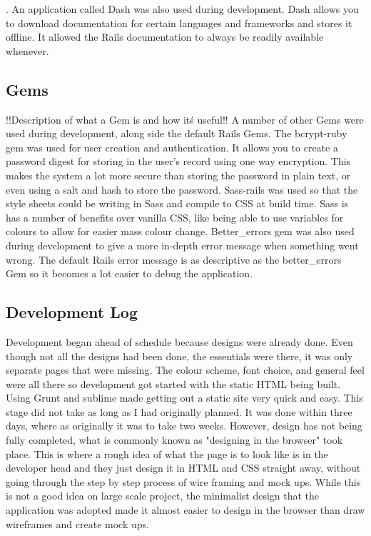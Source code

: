 \pageref{sec:deployment}. An application called Dash \citep{dash:2014} was also used during development. Dash allows you to download documentation for certain languages and frameworks and stores it offline. It allowed the Rails documentation to always be readily available whenever.

\subsection{Gems}
!!Description of what a Gem is and how it\'s useful!! A number of other Gems were used during development, along side the default Rails Gems. The bcrypt-ruby gem was used for user creation and authentication. It allows you to create a password digest for storing in the user's record using one way encryption. This makes the system a lot more secure than storing the password in plain text, or even using a salt and hash to store the password. Sass-rails was used so that the style sheets could be writing in Sass and compile to CSS at build time. Sass is has a number of benefits over vanilla CSS, like being able to use variables for colours to allow for easier mass colour change. Better_errors gem was also used during development to give a more in-depth error message when something went wrong. The default Rails error message is as descriptive as the better_errors Gem so it becomes a lot easier to debug the application.

\subsection{Development Log}
Development began ahead of schedule because designs were already done. Even though not all the designs had been done, the essentials were there, it was only separate pages that were missing. The colour scheme, font choice, and general feel were all there so development got started with the static HTML being built. Using Grunt \citep{grunt:2013} and sublime made getting out a static site very quick and easy. This stage did not take as long as I had originally planned. It was done within three days, where as originally it was to take two weeks. However, design has not being fully completed, what is commonly known as "designing in the browser" took place. This is where a rough idea of what the page is to look like is in the developer head and they just design it in HTML and CSS straight away, without going through the step by step process of wire framing and mock ups. While this is not a good idea on large scale project, the minimalist design that the application was adopted made it almost easier to design in the browser than draw wireframes and create mock ups.\\

